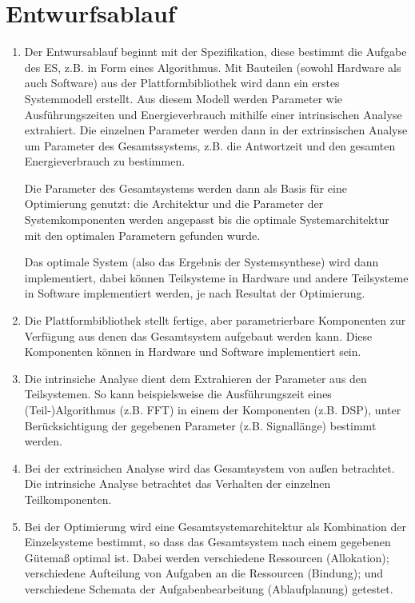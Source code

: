 \documentclass[DIN, pagenumber=false, fontsize=11pt, parskip=half]{scrartcl}
\begin{document}
    \section{Entwurfsablauf}
    \begin{enumerate}[label=\alph*)]
        \item Der Entwursablauf beginnt mit der Spezifikation, diese bestimmt die Aufgabe des ES, z.B.
            in Form eines Algorithmus. Mit Bauteilen (sowohl Hardware als auch Software) aus der
            Plattformbibliothek wird dann ein erstes Systemmodell erstellt. Aus diesem Modell werden
            Parameter wie Ausführungszeiten und Energieverbrauch mithilfe einer intrinsischen Analyse
            extrahiert. Die einzelnen Parameter werden dann in der extrinsischen Analyse um Parameter
            des Gesamtssystems, z.B. die Antwortzeit und den gesamten Energieverbrauch zu bestimmen.
            
            Die Parameter des Gesamtsystems werden dann als Basis für eine Optimierung genutzt: die Architektur
            und die Parameter der Systemkomponenten werden angepasst bis die optimale Systemarchitektur mit den
            optimalen Parametern gefunden wurde.

            Das optimale System (also das Ergebnis der Systemsynthese) wird dann implementiert, dabei können
            Teilsysteme in Hardware und andere Teilsysteme in Software implementiert werden, je nach Resultat
            der Optimierung.
        \item Die Plattformbibliothek stellt fertige, aber parametrierbare Komponenten zur Verfügung aus denen
            das Gesamtsystem aufgebaut werden kann. Diese Komponenten können in Hardware und Software implementiert
            sein.
        \item Die intrinsiche Analyse dient dem Extrahieren der Parameter aus den Teilsystemen. So kann beispielsweise
            die Ausführungszeit eines (Teil-)Algorithmus (z.B. FFT) in einem der Komponenten (z.B. DSP), unter 
            Berücksichtigung der gegebenen Parameter (z.B. Signallänge) bestimmt werden.
        \item Bei der extrinsichen Analyse wird das Gesamtsystem \glqq{}von außen\grqq{} betrachtet. Die intrinsiche
            Analyse betrachtet das Verhalten der einzelnen Teilkomponenten. 
        \item Bei der Optimierung wird eine Gesamtsystemarchitektur als Kombination der Einzelsysteme bestimmt,
            so dass das Gesamtsystem nach einem gegebenen Gütemaß optimal ist. Dabei werden verschiedene Ressourcen
            (Allokation); verschiedene Aufteilung von Aufgaben an die Ressourcen (Bindung); und verschiedene
            Schemata der Aufgabenbearbeitung (Ablaufplanung) getestet.
    \end{enumerate}
\end{document}
